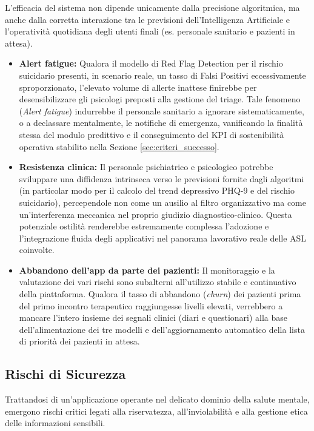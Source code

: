 L'efficacia del sistema non dipende unicamente dalla precisione algoritmica, ma anche dalla corretta interazione tra le previsioni dell'Intelligenza Artificiale e l'operatività quotidiana degli utenti finali (es. personale sanitario e pazienti in attesa).

\begin{itemize}
    \item \textbf{Alert fatigue:} Qualora il modello di Red Flag Detection per il rischio suicidario presenti, in scenario reale, un tasso di Falsi Positivi eccessivamente sproporzionato, l'elevato volume di allerte inattese finirebbe per desensibilizzare gli psicologi preposti alla gestione del triage. Tale fenomeno (\textit{Alert fatigue}) indurrebbe il personale sanitario a ignorare sistematicamente, o a declassare mentalmente, le notifiche di emergenza, vanificando la finalità stessa del modulo predittivo e il conseguimento del KPI di sostenibilità operativa stabilito nella Sezione \ref{sec:criteri_successo}.
    \item \textbf{Resistenza clinica:} Il personale psichiatrico e psicologico potrebbe sviluppare una diffidenza intrinseca verso le previsioni fornite dagli algoritmi (in particolar modo per il calcolo del trend depressivo PHQ-9 e del rischio suicidario), percependole non come un ausilio al filtro organizzativo ma come un'interferenza meccanica nel proprio giudizio diagnostico-clinico. Questa potenziale ostilità renderebbe estremamente complessa l'adozione e l'integrazione fluida degli applicativi nel panorama lavorativo reale delle ASL coinvolte.
    \item \textbf{Abbandono dell'app da parte dei pazienti:} Il monitoraggio e la valutazione dei vari rischi sono subalterni all'utilizzo stabile e continuativo della piattaforma. Qualora il tasso di abbandono (\textit{churn}) dei pazienti prima del primo incontro terapeutico raggiungesse livelli elevati, verrebbero a mancare l'intero insieme dei segnali clinici (diari e questionari) alla base dell'alimentazione dei tre modelli e dell'aggiornamento automatico della lista di priorità dei pazienti in attesa.
\end{itemize}

\subsection*{Rischi di Sicurezza}

Trattandosi di un'applicazione operante nel delicato dominio della salute mentale, emergono rischi critici legati alla riservatezza, all'inviolabilità e alla gestione etica delle informazioni sensibili.

